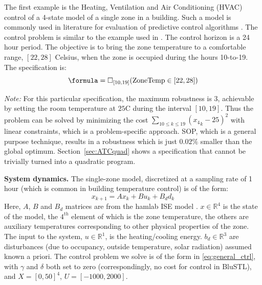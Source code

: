 
The first example is the Heating, Ventilation and Air Conditioning (HVAC) control of a 4-state model of a single zone in a building. Such a model is commonly used in literature for evaluation of predictive control algorithms \cite{Jain2016}. 
The control problem is similar to the example used in \cite{Raman14_MPCSTL}.
The control horizon is a 24 hour period.
The objective is to bring the zone temperature to a comfortable range, $[22,28]$ Celsius, when the zone is occupied during the hours 10-to-19. 
The specification is:
\begin{equation}
\label{eq:BldgSpec}
\formula = \always_{[10,19]}(\text{ZoneTemp} \in [22,28])
\end{equation}

\textit{Note:} For this particular specification, the maximum robustness is $3$, achievable by setting the room temperature at $25$C during the interval $[10,19]$.
Thus the problem can be solved by minimizing the cost $\sum_{10\leq k \leq 19}({x_4}_k-25)^2$ with linear constraints,
which is a problem-specific approach.
SOP, which is a general purpose technique, results in a robustness which is just $0.02\%$ smaller than the global optimum. 
Section~\ref{sec:ATCquad} shows a specification that cannot be trivially turned into a quadratic program.

\textbf{System dynamics.} The single-zone model, discretized at a sampling rate of 1 hour (which is common in building temperature control) is of the form:
\begin{equation}
\label{eq:bldg_dyn}
x_{k+1} = Ax_{k}+Bu_k+B_dd_k
\end{equation}
Here, $A$, $B$ and $B_d$ matrices are from the hamlab ISE model \cite{VanSchijndel2005}. $x \in \mathbb{R}^4$ is the state of the model, the $4^{th}$ element of which is the zone temperature, the others are auxiliary temperatures corresponding to other physical properties of the zone. 
The input to the system, $u \in \mathbb{R}^1$, is the heating/cooling energy. $b_d \in \mathbb{R}^3$ are disturbances (due to occupancy, outside temperature, solar radiation) assumed known a priori.
The control problem we solve is of the form in \eqref{eq:general_ctrl}, with $\gamma$ and $\delta$ both set to zero (correspondingly, no cost for control in BluSTL), and $X=[0,50]^4$, $U=[-1000,2000]$.

